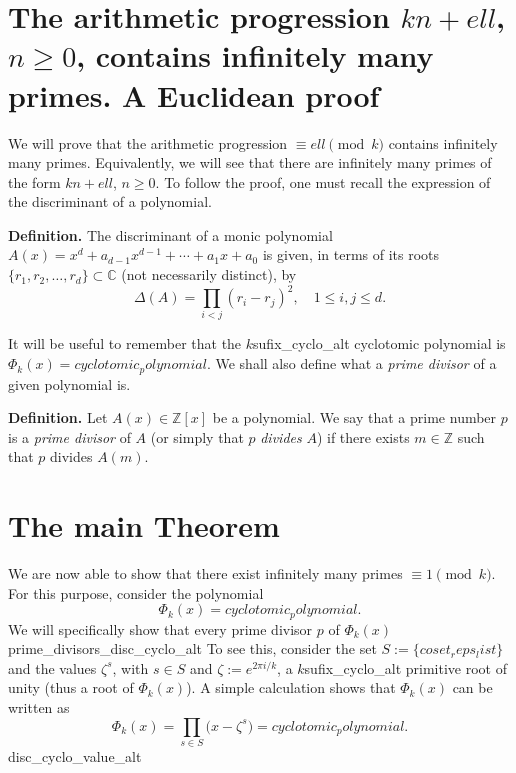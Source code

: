 \documentclass[a4paper, 12pt]{article}
\theoremstyle{definition}
\newcommand{\Z}{\mathbb{Z}}
\newcommand{\C}{\mathbb{C}}
\renewcommand\title{\textbf{The arithmetic progression ${k}n+{ell}$, $n\geqslant0$, contains infinitely many primes.\\ A Euclidean proof}}
\begin{document}
\thispagestyle{plain}
\sloppy
\section{The arithmetic progression ${k}n+{ell}$, $n\geqslant0$, contains infinitely many primes. A Euclidean proof}

We will prove that the arithmetic progression $\equiv {ell} \pmod{{k}}$ contains infinitely many primes. Equivalently, we will see that there are infinitely many primes of the form ${k}n+{ell}$, $n\geqslant0$. To follow the proof, one must recall the expression of the discriminant of a polynomial. 

\textbf{Definition.} The discriminant of a monic polynomial $A(x)=x^d+a_{d-1}x^{d-1}+\cdots+a_1x+a_0$ is given, in terms of its roots $\{r_1,r_2,\dots,r_d\}\subset\C$ (not necessarily distinct), by
\begin{equation}\label{eq:discrim}
	\Delta(A)=\prod_{i<j}(r_i-r_j)^2, \quad 1\leqslant i,j\leqslant d.
\end{equation}

It will be useful to remember that the ${k}${sufix_cyclo_alt} cyclotomic polynomial is $\Phi_{{k}}(x)={cyclotomic_polynomial}$. We shall also define what a \emph{prime divisor} of a given polynomial is.

\textbf{Definition.} Let $A(x)\in\Z[x]$ be a polynomial. We say that a prime number $p$ is a \emph{prime divisor} of $A$ (or simply that $p$ \emph{divides} $A$) if there exists $m\in\Z$ such that $p$ divides $A(m)$.

\section{The main Theorem}\label{sec:mainTh}

We are now able to show that there exist infinitely many primes $\equiv 1\pmod{{k}}$. For this purpose, consider the polynomial 
\begin{equation*}
\Phi_{{k}}(x)={cyclotomic_polynomial}.
\end{equation*}
We will specifically show that every prime divisor $p$ of $\Phi_{{k}}(x)$ {prime_divisors_disc_cyclo_alt} To see this, consider the set $S:=\{{coset_reps_list}\}$ and the values $\zeta^{s}$, with $s\in S$ and $\zeta:=e^{2\pi i/{{k}}}$, a ${k}${sufix_cyclo_alt} primitive root of unity (thus a root of $\Phi_{{k}}(x)$). A simple calculation shows that $\Phi_{{k}}(x)$ can be written as
\begin{equation*}
\Phi_{{k}}(x)=\prod_{s\in S}\big(x-\zeta^{s}\big)={cyclotomic_polynomial}.
\end{equation*}
{disc_cyclo_value_alt}
\end{document}
